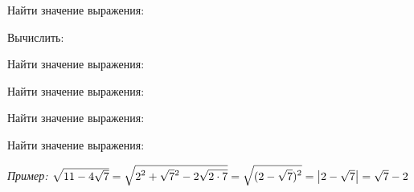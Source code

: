 \begin{listofex}
	\item Найти значение выражения:
	\begin{enumcols}[itemcolumns=3]
		\item {}
		\item {}
		\item {}
		\item {}
		\item {}
		\item {}
		\item {}
	\end{enumcols}
	\item Вычислить:
	\begin{enumcols}[itemcolumns=3]
		\item {}
		\item {}
		\item {}
	\end{enumcols}
	\item Найти значение выражения:
	\begin{enumcols}[itemcolumns=2]
		\item {}
		\item {}
		\item {}
	\end{enumcols}
	\item Найти значение выражения:
	\begin{enumcols}[itemcolumns=1]
		\item {}
		\item {}
	\end{enumcols}
	\item {}
	\item Найти значение выражения:
	\begin{enumcols}[itemcolumns=2]
		\item {}
		\item {}
	\end{enumcols}
	\item Найти значение выражения:
	
	\textit{Пример:} \( \sqrt{11-4\sqrt{7}}=\sqrt{\displaystyle2\mathstrut^2+\sqrt{7}\mathstrut^2-2\sqrt{2\cdot7}}=\sqrt{\displaystyle(2-\sqrt{7})^2}=\left|2-\sqrt{7}\right|=\sqrt{7} - 2 \)
	\begin{enumcols}[itemcolumns=2]
		\item {}
		\item {}
	\end{enumcols}
\end{listofex}